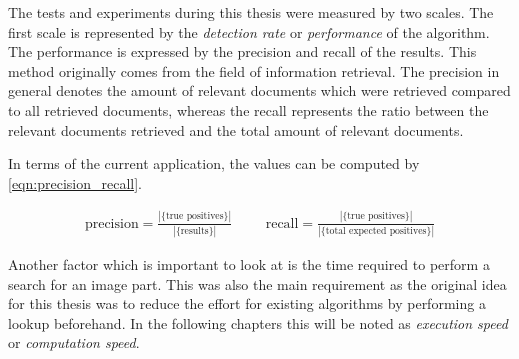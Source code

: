 The tests and experiments during this thesis were measured by two scales. The first scale is represented by the \textit{detection rate} or \textit{performance} of the algorithm. The performance is expressed by the precision and recall of the results. This method originally comes from the field of information retrieval. The precision in general denotes the amount of relevant documents which were retrieved compared to all retrieved documents, whereas the recall represents the ratio between the relevant documents retrieved and the total amount of relevant documents.

In terms of the current application, the values can be computed by \ref{eqn:precision_recall}.

\begin{align}
 \text{precision}=\frac{|\{\text{true positives}\}|}{|\{\text{results}\}|} &&&
 \text{recall}=\frac{|\{\text{true positives}\}|}{|\{\text{total expected positives}\}|} 
 \label{eqn:precision_recall}
\end{align}

Another factor which is important to look at is the time required to perform a search for an image part. This was also the main requirement as the original idea for this thesis was to reduce the effort for existing algorithms by performing a lookup beforehand. In the following chapters this will be noted as \textit{execution speed} or \textit{computation speed}.
